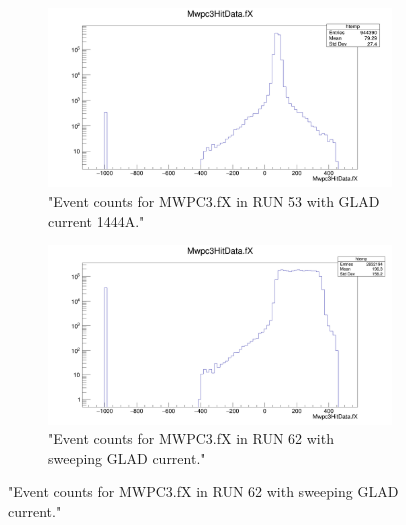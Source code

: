 \documentclass[12pt, letterpaper]{article}
\begin{document}
\begin{figure}[!htbp]
\begin{subfigure}{.5\textwidth}
	\centering
	\includegraphics[width=.9\linewidth]{run53_mw3.png}
	\caption{"Event counts for MWPC3.fX in RUN 53 with GLAD current 1444A."}
	\label{fig:sub-second}
\end{subfigure}	
\begin{subfigure}{.5\textwidth}
	\centering
	\includegraphics[width=.9\linewidth]{run62_mw3.png}
	\caption{"Event counts for MWPC3.fX in RUN 62 with sweeping GLAD current."}
	\label{fig:sub-second}
\end{subfigure}
\end{figure}
\end{document}
